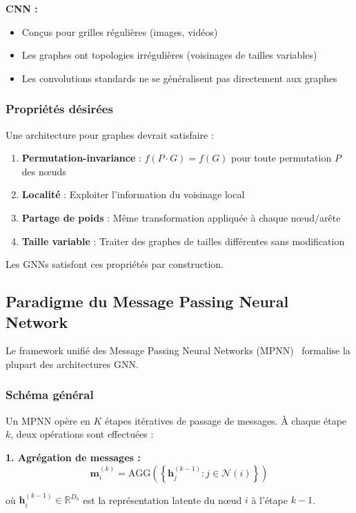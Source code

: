 \textbf{CNN :}
\begin{itemize}
    \item Conçus pour grilles régulières (images, vidéos)
    \item Les graphes ont topologies irrégulières (voisinages de tailles variables)
    \item Les convolutions standards ne se généralisent pas directement aux graphes
\end{itemize}

\subsubsection{Propriétés désirées}

Une architecture pour graphes devrait satisfaire :
\begin{enumerate}
    \item \textbf{Permutation-invariance} : $f(P \cdot G) = f(G)$ pour toute permutation $P$ des nœuds
    \item \textbf{Localité} : Exploiter l'information du voisinage local
    \item \textbf{Partage de poids} : Même transformation appliquée à chaque nœud/arête
    \item \textbf{Taille variable} : Traiter des graphes de tailles différentes sans modification
\end{enumerate}

Les GNNs satisfont ces propriétés par construction.

\subsection{Paradigme du Message Passing Neural Network}

Le framework unifié des Message Passing Neural Networks (MPNN)~\cite{Gilmer2017} formalise la plupart des architectures GNN.

\subsubsection{Schéma général}

Un MPNN opère en $K$ étapes itératives de passage de messages. À chaque étape $k$, deux opérations sont effectuées :

\textbf{1. Agrégation de messages :}
\[
\mathbf{m}_i^{(k)} = \text{AGG}\left(\left\{\mathbf{h}_j^{(k-1)} : j \in \mathcal{N}(i)\right\}\right)
\]

où $\mathbf{h}_i^{(k-1)} \in \mathbb{R}^{D_h}$ est la représentation latente du nœud $i$ à l'étape $k-1$.

